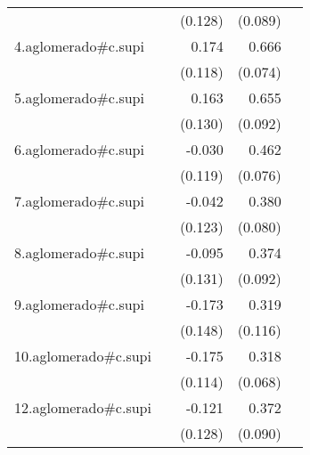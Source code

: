 {\begin{longtable}{l*{4}{D{.}{.}{-1}}}
            &                     &     (0.128)         &     (0.089)         &                     \\
\addlinespace
4.aglomerado#c.supi&                     &       0.174         &       0.666\sym{***}&                     \\
            &                     &     (0.118)         &     (0.074)         &                     \\
\addlinespace
5.aglomerado#c.supi&                     &       0.163         &       0.655\sym{***}&                     \\
            &                     &     (0.130)         &     (0.092)         &                     \\
\addlinespace
6.aglomerado#c.supi&                     &      -0.030         &       0.462\sym{***}&                     \\
            &                     &     (0.119)         &     (0.076)         &                     \\
\addlinespace
7.aglomerado#c.supi&                     &      -0.042         &       0.380\sym{***}&                     \\
            &                     &     (0.123)         &     (0.080)         &                     \\
\addlinespace
8.aglomerado#c.supi&                     &      -0.095         &       0.374\sym{***}&                     \\
            &                     &     (0.131)         &     (0.092)         &                     \\
\addlinespace
9.aglomerado#c.supi&                     &      -0.173         &       0.319\sym{**} &                     \\
            &                     &     (0.148)         &     (0.116)         &                     \\
\addlinespace
10.aglomerado#c.supi&                     &      -0.175         &       0.318\sym{***}&                     \\
            &                     &     (0.114)         &     (0.068)         &                     \\
\addlinespace
12.aglomerado#c.supi&                     &      -0.121         &       0.372\sym{***}&                     \\
            &                     &     (0.128)         &     (0.090)         &                     \\

\end{longtable}}
